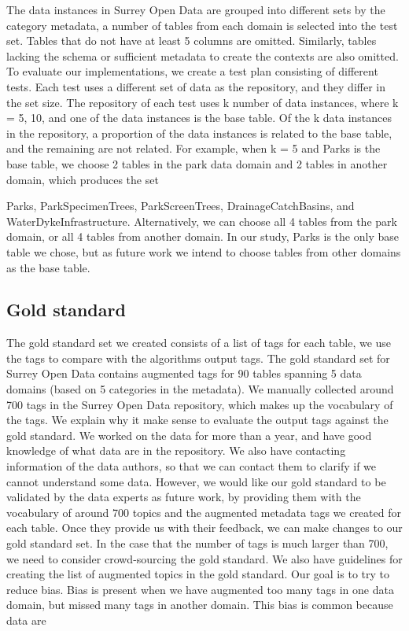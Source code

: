 The data instances in Surrey Open Data are grouped into different sets by the category metadata, a number of tables from each domain is selected into the test set. Tables that do not have at least 5 columns are omitted. Similarly, tables lacking the schema or sufficient metadata to create the contexts are also omitted. To evaluate our implementations, we create a test plan consisting of different tests. Each test uses a different set of data as the repository, and they differ in the set size. The repository of each test uses k number of data instances, where k = 5, 10, and one of the data instances is the base table.
Of the k data instances in the repository, a proportion of the data instances is related to the base table, and the remaining are not related. For example, when k = 5 and Parks is the base table, we choose 2 tables in the park data domain and 2 tables in another domain, which produces the set

{Parks, ParkSpecimenTrees, ParkScreenTrees, DrainageCatchBasins, and WaterDykeInfrastructure}. Alternatively, we can choose all 4 tables from the park domain, or all 4 tables from another domain. In our study, Parks is the only base table we chose, but as future work we intend to choose tables from other domains as the base table.

\subsection{Gold standard}
\label{ssec:GoldStandard}

The gold standard set we created consists of a list of tags for each table, we use the tags to compare with the algorithms output tags. The gold standard set for Surrey Open Data contains augmented tags for 90 tables spanning 5 data domains (based on 5 categories in the metadata). We manually collected around 700 tags in the Surrey Open Data repository, which makes up the vocabulary of the tags. We explain why it make sense to evaluate the output tags against the gold standard. We worked on the data for more than a year, and have good knowledge of what data are in the repository. We also have contacting information of the data authors, so that we can contact them to clarify if we cannot understand some data. However, we would like our gold standard to be validated by the data experts as future work, by providing them with the vocabulary of around 700 topics and the augmented metadata tags we created for each table. Once they provide us with their feedback, we can make changes to our gold standard set. In the case that the number of tags is much larger than 700, we need to consider crowd-sourcing the gold standard.
We also have guidelines for creating the list of augmented topics in the gold standard. Our goal is to try to reduce bias. Bias is present when we have augmented too many tags in one data domain, but missed many tags in another domain. This bias is common because data are

